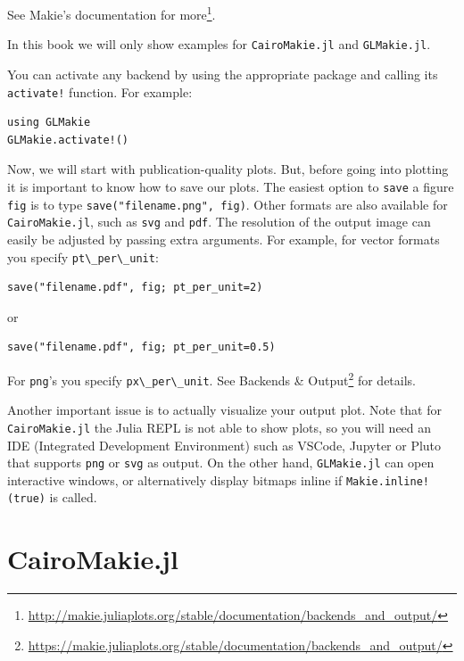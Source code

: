 \documentclass[
  notoc %
]{tufte-book}
\DeclareRobustCommand{\href}[2]{#2\footnote{\url{#1}}}
\newcommand{\passthrough}[1]{#1}
\begin{document}
\href{http://makie.juliaplots.org/stable/documentation/backends_and_output/}{See
Makie's documentation for more}.

In this book we will only show examples for
\passthrough{\lstinline!CairoMakie.jl!} and
\passthrough{\lstinline!GLMakie.jl!}.

You can activate any backend by using the appropriate package and
calling its \passthrough{\lstinline"activate!"} function. For example:

\begin{lstlisting}
using GLMakie
GLMakie.activate!()
\end{lstlisting}

Now, we will start with publication-quality plots. But, before going
into plotting it is important to know how to save our plots. The easiest
option to \passthrough{\lstinline!save!} a figure
\passthrough{\lstinline!fig!} is to type
\passthrough{\lstinline!save("filename.png", fig)!}. Other formats are
also available for \passthrough{\lstinline!CairoMakie.jl!}, such as
\passthrough{\lstinline!svg!} and \passthrough{\lstinline!pdf!}. The
resolution of the output image can easily be adjusted by passing extra
arguments. For example, for vector formats you specify
\passthrough{\lstinline!pt\_per\_unit!}:

\begin{lstlisting}
save("filename.pdf", fig; pt_per_unit=2)
\end{lstlisting}

or

\begin{lstlisting}
save("filename.pdf", fig; pt_per_unit=0.5)
\end{lstlisting}

For \passthrough{\lstinline!png!}'s you specify
\passthrough{\lstinline!px\_per\_unit!}. See
\href{https://makie.juliaplots.org/stable/documentation/backends_and_output/}{Backends
\& Output} for details.

Another important issue is to actually visualize your output plot. Note
that for \passthrough{\lstinline!CairoMakie.jl!} the Julia REPL is not
able to show plots, so you will need an IDE (Integrated Development
Environment) such as VSCode, Jupyter or Pluto that supports
\passthrough{\lstinline!png!} or \passthrough{\lstinline!svg!} as
output. On the other hand, \passthrough{\lstinline!GLMakie.jl!} can open
interactive windows, or alternatively display bitmaps inline if
\passthrough{\lstinline"Makie.inline!(true)"} is called.

\hypertarget{sec:cairomakie}{%
\section{CairoMakie.jl}\label{sec:cairomakie}}
\end{document}
